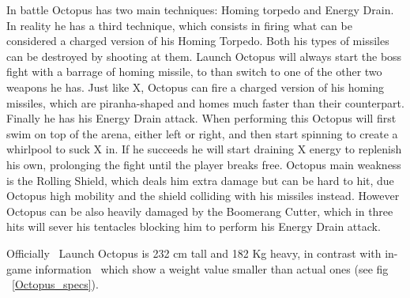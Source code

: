 In battle Octopus has two main techniques: Homing torpedo and Energy Drain. In reality he has a third technique, which consists in firing what can be considered a charged version of his Homing Torpedo. Both his types of missiles can be destroyed by shooting at them. Launch Octopus will always start the boss fight with a barrage of homing missile, to than  switch to one of the other two weapons he has. Just like X, Octopus can fire a charged version of his homing missiles, which are piranha-shaped and homes much faster than their counterpart. Finally he has his Energy Drain attack. When performing this Octopus will first swim on top of the arena, either left or right, and then start spinning to create a whirlpool to suck X in. If he succeeds he will start draining X energy to replenish his own, prolonging the fight until the player breaks free. Octopus main weakness is the Rolling Shield, which deals him extra damage but can be hard to hit, due Octopus high mobility and the shield colliding with his missiles instead. However Octopus can be also heavily damaged by the Boomerang Cutter, which in three hits will sever his tentacles blocking him to perform his Energy Drain attack. 


Officially~\cite{wayback:X_resources} Launch Octopus is 232 cm tall and 182 Kg heavy, in contrast with in-game information~\cite{wiki:Launch_octopus} which show a weight value smaller than actual ones (see fig ~\ref{Octopus_specs}).

